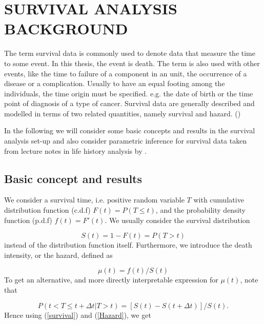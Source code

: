 \chapter{SURVIVAL ANALYSIS BACKGROUND}
\label{sec:second}

The term survival data is commonly used to denote data that measure the time to some event. In this thesis, the event is death. The term is also used with other events, like the time to failure of a component in an unit, the occurrence of a disease or a complication. Usually to have an equal footing among the individuals, the time origin must be specified. e.g. the date of birth or the time point of diagnosis of a type of cancer. Survival data are generally described and modelled in terms of two related quantities, namely survival and hazard. (\cite{CBLA03})

In the following we will consider  some basic concepts and results in the survival analysis set-up and also consider parametric inference for survival data taken from lecture notes in life history analysis by \textcite{B90}.
 
\section{Basic concept and results}

We consider a survival time, i.e. positive random variable $T$ with cumulative distribution function (c.d.f)
$F(t) = P(T \leq{t} )$, 
and the probability density function (p.d.f) $f(t) = F'(t)$.
We usually consider the survival distribution  

\begin{equation}
  S(t) = 1 - F(t)= P(T > t ) 
  \label{survival}
\end{equation}
instead of the distribution function itself. 
Furthermore, we introduce the death intensity, or the hazard, defined as

\begin{equation}
 \mu(t) = f(t) / S(t) 
 \label{Hazard}
\end{equation}
To get an alternative, and more directly interpretable expression for $\mu(t)$, note that

\begin{equation*}
    P(t<T\leq{t+\Delta t  |  T>t}) = [S(t) - S(t + \Delta t)]/S(t).
\end{equation*} 
Hence using (\ref{survival}) and (\ref{Hazard}), we get \ 

